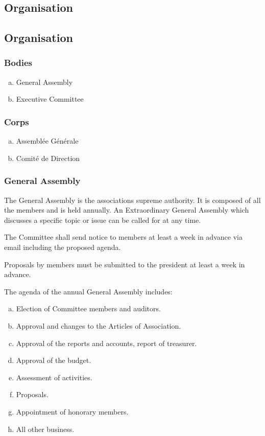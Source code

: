 \documentclass[12pt,a4paper,oneside]{article}
\newcounter{art}
\newcommand{\english}{    \switchcolumn[0]\noindent}
\newcommand{\french}{    \switchcolumn[1]\noindent}
\begin{document}
\begin{paracol}{2}


\english
	\subsection{Organisation}


\french
	\subsection{Organisation}

	\english
	\subsubsection{Bodies}

	\begin{enumerate}[(a)]
	\item General Assembly
	\item Executive Committee
	\end{enumerate}

\french
	\subsubsection{Corps}

	\begin{enumerate}[(a)]
	\item Assemblée Générale
	\item Comité de Direction
	\end{enumerate}

	\english
	\subsubsection{General Assembly}
	The General Assembly is the associations supreme authority. It is composed of all the members and is held annually. An Extraordinary General Assembly which discusses a specific topic or issue can be called for at any time.

	The Committee shall send notice to members at least a week in advance via email including the proposed agenda.

	Proposals by members must be submitted to the president at least a week in advance.

	The agenda of the annual General Assembly includes:
	\begin{enumerate}[(a)]
	\item Election of Committee members and auditors.
	\item Approval and changes to the Articles of Association.
	\item Approval of the reports and accounts, report of treasurer.
	\item Approval of the budget.
	\item Assessment of activities.
	\item Proposals.
	\item Appointment of honorary members.
	\item All other business.
	\end{enumerate}


\end{paracol}
\end{document}
